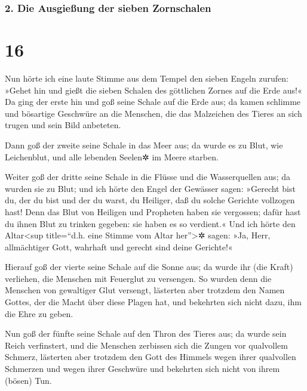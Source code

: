 \hypertarget{die-ausgieuxdfung-der-sieben-zornschalen}{%
\subsubsection{2. Die Ausgießung der sieben
Zornschalen}\label{die-ausgieuxdfung-der-sieben-zornschalen}}

\hypertarget{section-15}{%
\section{16}\label{section-15}}

 Nun hörte ich eine laute Stimme aus dem Tempel den sieben
Engeln zurufen: »Gehet hin und gießt die sieben Schalen des göttlichen
Zornes auf die Erde aus!«  Da ging der erste hin und goß
seine Schale auf die Erde aus; da kamen schlimme und bösartige Geschwüre
an die Menschen, die das Malzeichen des Tieres an sich trugen und sein
Bild anbeteten.

 Dann goß der zweite seine Schale in das Meer aus; da
wurde es zu Blut, wie Leichenblut, und alle lebenden Seelen✲ im Meere
starben.

 Weiter goß der dritte seine Schale in die Flüsse und die
Wasserquellen aus; da wurden sie zu Blut;  und ich hörte
den Engel der Gewässer sagen: »Gerecht bist du, der du bist und der du
warst, du Heiliger, daß du solche Gerichte vollzogen hast!
 Denn das Blut von Heiligen und Propheten haben sie
vergossen; dafür hast du ihnen Blut zu trinken gegeben: sie haben es so
verdient.«  Und ich hörte den Altar\textless sup
title=``d.h. eine Stimme vom Altar her''\textgreater✲ sagen: »Ja, Herr,
allmächtiger Gott, wahrhaft und gerecht sind deine Gerichte!«

 Hierauf goß der vierte seine Schale auf die Sonne aus; da
wurde ihr (die Kraft) verliehen, die Menschen mit Feuerglut zu
versengen.  So wurden denn die Menschen von gewaltiger
Glut versengt, lästerten aber trotzdem den Namen Gottes, der die Macht
über diese Plagen hat, und bekehrten sich nicht dazu, ihm die Ehre zu
geben.

 Nun goß der fünfte seine Schale auf den Thron des Tieres
aus; da wurde sein Reich verfinstert, und die Menschen zerbissen sich
die Zungen vor qualvollem Schmerz,  lästerten aber
trotzdem den Gott des Himmels wegen ihrer qualvollen Schmerzen und wegen
ihrer Geschwüre und bekehrten sich nicht von ihrem (bösen) Tun.

